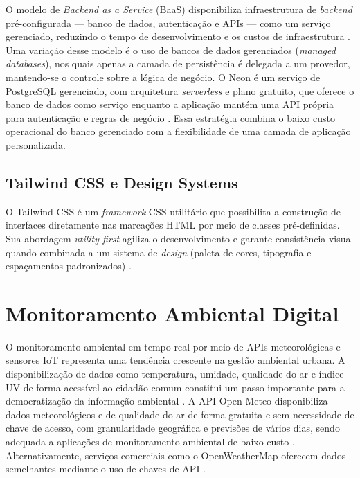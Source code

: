 \documentclass[
	12pt,
	openright,
	oneside,
	a4paper,
	chapter=TITLE,
	section=TITLE,
	subsection=TITLE,
	subsubsection=TITLE,
	english,
	brazil
	]{abntex2}
\begin{document}
O modelo de \textit{Backend as a Service} (BaaS) disponibiliza infraestrutura de \textit{backend} pré-configurada — banco de dados, autenticação e APIs — como um serviço gerenciado, reduzindo o tempo de desenvolvimento e os custos de infraestrutura \cite{LANE2017}. Uma variação desse modelo é o uso de bancos de dados gerenciados (\textit{managed databases}), nos quais apenas a camada de persistência é delegada a um provedor, mantendo-se o controle sobre a lógica de negócio. O Neon é um serviço de PostgreSQL gerenciado, com arquitetura \textit{serverless} e plano gratuito, que oferece o banco de dados como serviço enquanto a aplicação mantém uma API própria para autenticação e regras de negócio \cite{NEONDOCS2024}. Essa estratégia combina o baixo custo operacional do banco gerenciado com a flexibilidade de uma camada de aplicação personalizada.

\subsection{Tailwind CSS e Design Systems}

O Tailwind CSS é um \textit{framework} CSS utilitário que possibilita a construção de interfaces diretamente nas marcações HTML por meio de classes pré-definidas. Sua abordagem \textit{utility-first} agiliza o desenvolvimento e garante consistência visual quando combinada a um sistema de \textit{design} (paleta de cores, tipografia e espaçamentos padronizados) \cite{TAILWINDDOCS2024}.

\section{Monitoramento Ambiental Digital}

O monitoramento ambiental em tempo real por meio de APIs meteorológicas e sensores IoT representa uma tendência crescente na gestão ambiental urbana. A disponibilização de dados como temperatura, umidade, qualidade do ar e índice UV de forma acessível ao cidadão comum constitui um passo importante para a democratização da informação ambiental \cite{ANTUNES2020}. A API Open-Meteo disponibiliza dados meteorológicos e de qualidade do ar de forma gratuita e sem necessidade de chave de acesso, com granularidade geográfica e previsões de vários dias, sendo adequada a aplicações de monitoramento ambiental de baixo custo \cite{OPENMETEO2024}. Alternativamente, serviços comerciais como o OpenWeatherMap oferecem dados semelhantes mediante o uso de chaves de API \cite{OWMDOCS2024}.
\end{document}
